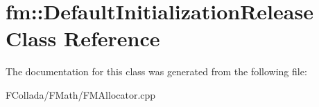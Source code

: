 \hypertarget{classfm_1_1DefaultInitializationRelease}{
\section{fm::DefaultInitializationRelease Class Reference}
\label{classfm_1_1DefaultInitializationRelease}
}


The documentation for this class was generated from the following file:\begin{DoxyCompactItemize}
\item 
FCollada/FMath/FMAllocator.cpp\end{DoxyCompactItemize}
